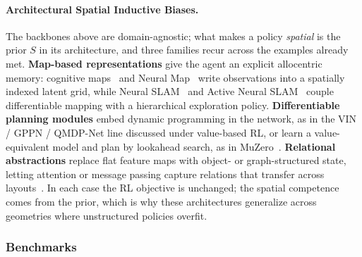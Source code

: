 \paragraph{Architectural Spatial Inductive Biases.}
The backbones above are domain-agnostic; what makes a policy \emph{spatial} is the prior $S$ in its architecture, and three families recur across the examples already met.
\textbf{Map-based representations} give the agent an explicit allocentric memory: cognitive maps~\cite{gupta2017cognitivemapping} and Neural Map~\cite{parisotto2018neural} write observations into a spatially indexed latent grid, while Neural SLAM~\cite{zhang2017neuralslam} and Active Neural SLAM~\cite{chaplot2020learning} couple differentiable mapping with a hierarchical exploration policy.
\textbf{Differentiable planning modules} embed dynamic programming in the network, as in the VIN / GPPN / QMDP-Net line discussed under value-based RL, or learn a value-equivalent model and plan by lookahead search, as in MuZero~\cite{schrittwieser2020mastering}.
\textbf{Relational abstractions} replace flat feature maps with object- or graph-structured state, letting attention or message passing capture relations that transfer across layouts~\cite{zambaldi2019relationaldeep}.
In each case the RL objective is unchanged; the spatial competence comes from the prior, which is why these architectures generalize across geometries where unstructured policies overfit.


\subsubsection{Benchmarks}

